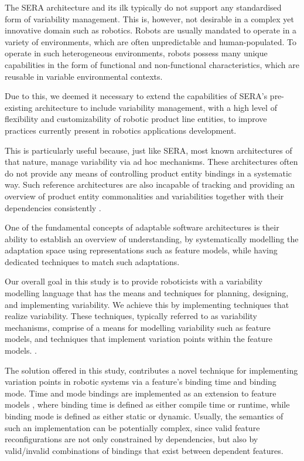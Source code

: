 \documentclass[conference]{IEEEtran}
\begin{document}
The SERA architecture and its ilk typically do not support any standardised form of variability management. This is, however, not desirable in a complex yet innovative domain such as robotics. Robots are usually mandated to operate in a variety of environments, which are often unpredictable and human-populated. To operate in such heterogeneous environments, robots possess many unique capabilities in the form of functional and non-functional characteristics, which are reusable in variable environmental contexts.

Due to this, we deemed it necessary to extend the capabilities of SERA's pre-existing architecture to include variability management, with a high level of flexibility and customizability of robotic product line entities, to improve practices currently present in robotics applications development.

This is particularly useful because, just like SERA, most known architectures of that nature, manage variability via ad hoc mechanisms. These architectures often do not provide any means of controlling product entity bindings in a systematic way. Such reference architectures are also incapable of tracking and providing an overview of product entity commonalities and variabilities together with their dependencies consistently \cite{var-mod-ind}.

One of the fundamental concepts of adaptable software architectures is their ability to establish an overview of understanding, by systematically modelling the adaptation space using representations such as feature models, while having dedicated techniques to match such adaptations.

Our overall goal in this study is to provide roboticists with a variability modelling language that has the means and techniques for planning, designing, and implementing variability. We achieve this by implementing techniques that realize variability. These techniques, typically referred to as variability mechanisms, comprise of a means for modelling variability such as feature models, and techniques that implement variation points within the feature models. \cite{var-mod-ind}.

The solution offered in this study, contributes a novel technique for implementing variation points in robotic systems via a feature's binding time and binding mode. Time and mode bindings are implemented as an extension to feature models \cite{flex-feat-bind}, where binding time is defined as either compile time or runtime, while binding mode is defined as either static or dynamic. Usually, the semantics of such an implementation can be potentially complex, since valid feature reconfigurations are not only constrained by dependencies, but also by valid/invalid combinations of bindings that exist between dependent features.
\end{document}
